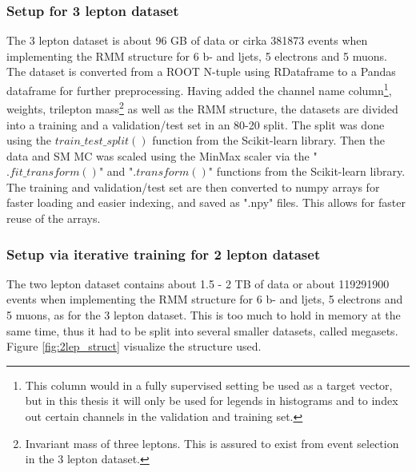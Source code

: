 \subsubsection*{Setup for 3 lepton dataset}
The 3 lepton dataset is about 96 GB of data or cirka 381873 events when implementing the RMM structure for 6 b- and ljets, 5 electrons and 5 muons. The dataset 
is converted from a ROOT N-tuple using RDataframe to a Pandas dataframe\cite{reback2020pandas} for further preprocessing. Having added the channel name column\footnote{This column would in a fully supervised setting be used as a target vector, but in this thesis it will only be used for legends in
histograms and to index out certain channels in the validation and training set. },  weights, 
trilepton mass\footnote{Invariant mass of three leptons. This is assured to exist from event selection in the 3 lepton dataset.} as well as the RMM structure, 
the datasets are divided into 
a training and a validation/test set in an 80-20 split. The split was done using the $train\_test\_split()$ function from the Scikit-learn library\cite{scikit-learn}.
Then the data and SM MC was scaled using the MinMax scaler via the "$.fit\_transform()$" and "$.transform()$" functions from the 
Scikit-learn library. The training and validation/test set are then converted to numpy arrays\cite{harris2020array} for faster 
loading and easier indexing, and saved as ".npy" files. This allows for faster reuse of the arrays. 

\subsubsection*{Setup via iterative training for 2 lepton dataset}
The two lepton dataset contains about 1.5 - 2 TB of data or about 119291900 events when implementing the RMM structure for 6 
b- and ljets, 5 electrons and 5 muons, as for the 3 lepton dataset. This is too much to hold in memory at the same time, thus it had to 
be split into several smaller datasets, called megasets. Figure \ref{fig:2lep_struct} visualize the structure used. 

